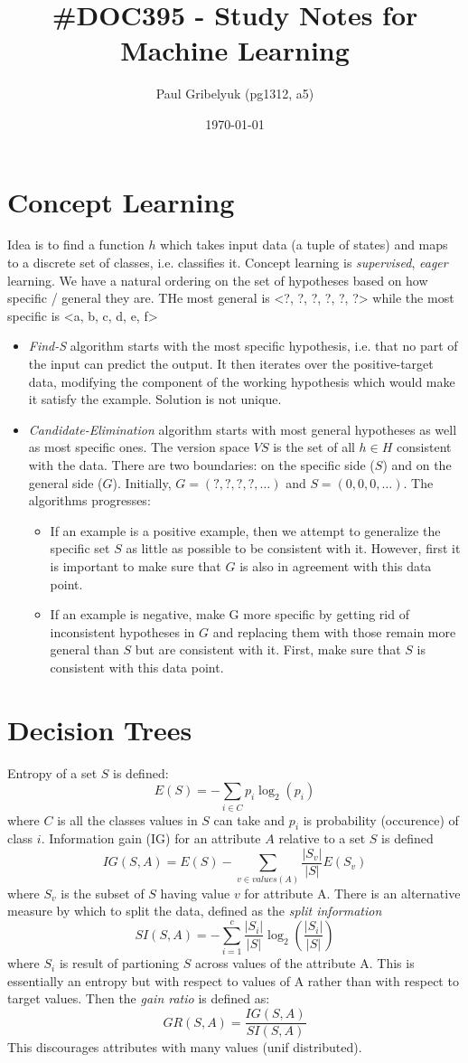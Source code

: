\documentclass[a4paper,10pt]{article}
\author{Paul Gribelyuk (pg1312, a5)}
\title{\Large \#DOC395 - Study Notes for Machine Learning}
\date{\today}
\begin{document}
\maketitle
\section{Concept Learning}
Idea is to find a function $h$ which takes input data (a tuple of states) and maps to a discrete set of classes, i.e. classifies it.  Concept learning is \emph{supervised}, \emph{eager} learning.  We have a natural ordering on the set of hypotheses based on how specific / general they are.  THe most general is <?, ?, ?, ?, ?, ?> while the most specific is <a, b, c, d, e, f> 
\begin{itemize}
\item \emph{Find-S} algorithm starts with the most specific hypothesis, i.e. that no part of the input can predict the output.  It then iterates over the positive-target data, modifying the component of the working hypothesis which would make it satisfy the example.  Solution is not unique.
\item \emph{Candidate-Elimination} algorithm starts with most general hypotheses as well as most specific ones.  The version space $VS$ is the set of all $h\in H$ consistent with the data.  There are two boundaries: on the specific side ($S$) and on the general side ($G$).  Initially, $G = (?,?,?,?,\ldots)$ and $S=(0,0,0,\ldots)$.  The algorithms progresses:
\begin{itemize}
\item If an example is a positive example, then we attempt to generalize the specific set $S$ as little as possible to be consistent with it.  However, first it is important to make sure that $G$ is also in agreement with this data point.
\item If an example is negative, make G more specific by getting rid of inconsistent hypotheses in $G$ and replacing them with those remain more general than $S$ but are consistent with it.  First, make sure that $S$ is consistent with this data point.
\end{itemize}
\end{itemize}

\section{Decision Trees}
Entropy of a set $S$ is defined:
$$
E(S) = -\sum_{i\in C} p_i\log_2(p_i)
$$
where $C$ is all the classes values in $S$ can take and $p_i$ is probability (occurence) of class $i$.
Information gain (IG) for an attribute $A$ relative to a set $S$ is defined
$$
IG(S, A) = E(S) - \sum_{v\in values(A)}\frac{|S_v|}{|S|}E(S_v)
$$
where $S_v$ is the subset of $S$ having value $v$ for attribute A.  There is an alternative measure by which to split the data, defined as the \emph{split information}
$$
SI(S, A) = -\sum_{i=1}^c \frac{|S_i|}{|S|}\log_2\left(\frac{|S_i|}{|S|}\right)
$$
where $S_i$ is result of partioning $S$ across values of the attribute A.  This is essentially an entropy but with respect to values of A rather than with respect to target values.  Then the \emph{gain ratio} is defined as:
$$
GR(S, A) = \frac{IG(S, A)}{SI(S, A)}
$$
This discourages attributes with many values (unif distributed).
\end{document}
